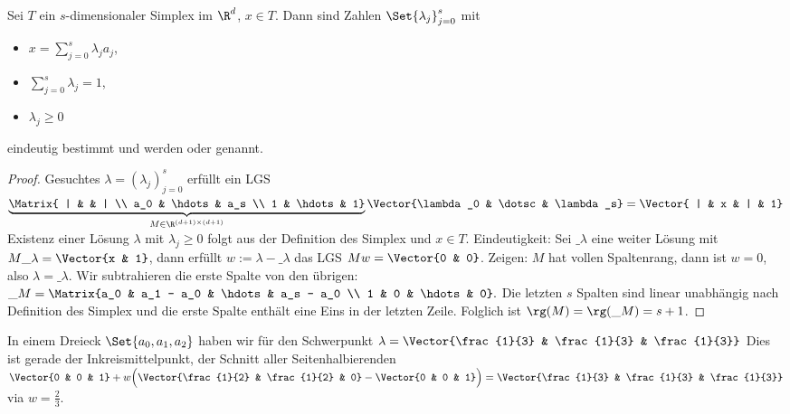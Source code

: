 \begin{lem} \label{3.58}
	Sei $T$ ein $s$-dimensionaler Simplex im $\R^d$, $x \in T$.
	Dann sind Zahlen $\Set{\lambda_j}_{j=0}^s$ mit
	\begin{itemize}
		\item
			$x = \sum_{j=0}^{s} \lambda_j a_j$,
		\item
			$\sum_{j=0}^s \lambda_j = 1$,
		\item
			$\lambda_j \ge 0$
	\end{itemize}
	eindeutig bestimmt und werden  oder  genannt.
	\begin{proof}
		Gesuchtes $\lambda = (\lambda_j)_{j=0}^s$ erfüllt ein LGS
		\begin{math}
			\underbrace{\Matrix{ | & & | \\ a_0 & \hdots & a_s \\ 1 & \hdots & 1}}_{M \in \R^{(d+1)\times (d+1)}}
			\Vector{\lambda_0 & \dotsc & \lambda_s}
			=
			\Vector{ | & x & | & 1}
		\end{math}
		Existenz einer Lösung $\lambda$ mit $\lambda_j \ge 0$ folgt aus der Definition des Simplex und $x \in T$.
		Eindeutigkeit:
		Sei $\_\lambda$ eine weiter Lösung mit $M \_\lambda = \Vector{x & 1}$, dann erfüllt $w := \lambda - \_\lambda$ das LGS $M w = \Vector{0 & 0}$.
		Zeigen: $M$ hat vollen Spaltenrang, dann ist $w = 0$, also $\lambda = \_\lambda$.
		Wir subtrahieren die erste Spalte von den übrigen:
		\begin{math}
			\_M
			= \Matrix{a_0 & a_1 - a_0 & \hdots & a_s - a_0 \\ 1 & 0 & \hdots & 0}.
		\end{math}
		Die letzten $s$ Spalten sind linear unabhängig nach Definition des Simplex und die erste Spalte enthält eine Eins in der letzten Zeile.
		Folglich ist $\rg(M) = \rg(\_M) = s + 1$.
	\end{proof}
\end{lem}

\begin{ex*}
	In einem Dreieck $\Set{a_0, a_1, a_2}$ haben wir für den Schwerpunkt
	\begin{math}
		\lambda = \Vector{\frac{1}{3} & \frac{1}{3} & \frac{1}{3}}
	\end{math} 
	Dies ist gerade der Inkreismittelpunkt, der Schnitt aller Seitenhalbierenden
	\begin{math}
		\Vector{0 & 0 & 1} + w \Big( \Vector{\frac{1}{2} & \frac{1}{2} & 0} - \Vector{0 & 0 & 1} \Big)
		= \Vector{\frac{1}{3} & \frac{1}{3} & \frac{1}{3}}
	\end{math}
	via $w = \frac{2}{3}$.
\end{ex*}


